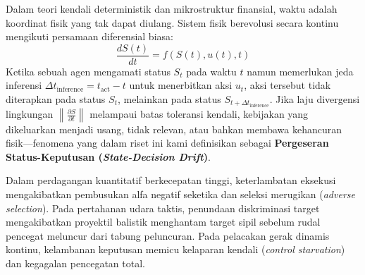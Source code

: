 \documentclass[journal,compsoc]{IEEEtran}
\begin{document}
Dalam teori kendali deterministik dan mikrostruktur finansial, waktu adalah koordinat fisik yang tak dapat diulang. Sistem fisik berevolusi secara kontinu mengikuti persamaan diferensial biasa:
\begin{equation}
\frac{d S(t)}{dt} = f(S(t), u(t), t)
\end{equation}
Ketika sebuah agen mengamati status $S_t$ pada waktu $t$ namun memerlukan jeda inferensi $\Delta t_{\text{inference}} = t_{\text{act}} - t$ untuk menerbitkan aksi $u_t$, aksi tersebut tidak diterapkan pada status $S_t$, melainkan pada status $S_{t + \Delta t_{\text{inference}}}$. Jika laju divergensi lingkungan $\left\|\frac{\partial S}{\partial t}\right\|$ melampaui batas toleransi kendali, kebijakan yang dikeluarkan menjadi usang, tidak relevan, atau bahkan membawa kehancuran fisik---fenomena yang dalam riset ini kami definisikan sebagai \textbf{Pergeseran Status-Keputusan (\textit{State-Decision Drift})}.

Dalam perdagangan kuantitatif berkecepatan tinggi, keterlambatan eksekusi mengakibatkan pembusukan alfa negatif seketika dan seleksi merugikan (\textit{adverse selection}). Pada pertahanan udara taktis, penundaan diskriminasi target mengakibatkan proyektil balistik menghantam target sipil sebelum rudal pencegat meluncur dari tabung peluncuran. Pada pelacakan gerak dinamis kontinu, kelambanan keputusan memicu kelaparan kendali (\textit{control starvation}) dan kegagalan pencegatan total.
\end{document}
